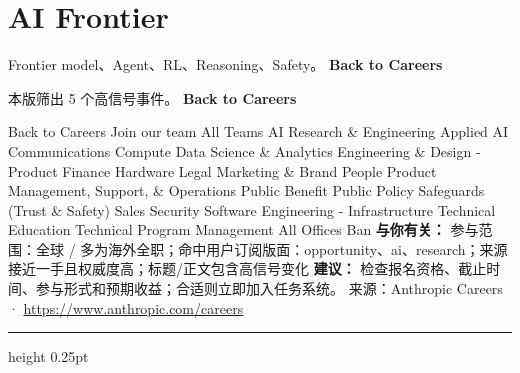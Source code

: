 \documentclass[10.5pt]{ctexart}
\begin{document}
\section*{AI Frontier}
{\color{ormuted} Frontier model、Agent、RL、Reasoning、Safety。}
\vspace{2mm}
{\LARGE\bfseries Back to Careers}\par
\vspace{1mm}
{\color{ormuted} 本版筛出 5 个高信号事件。}
\vspace{3mm}
{\Large\bfseries Back to Careers}\par
Back to Careers Join our team All Teams AI Research \& Engineering Applied AI Communications Compute Data Science \& Analytics Engineering \& Design - Product Finance Hardware Legal Marketing \& Brand People Product Management, Support, \& Operations Public Benefit Public Policy Safeguards (Trust \& Safety) Sales Security Software Engineering - Infrastructure Technical Education Technical Program Management All Offices Ban
\textbf{与你有关：} 参与范围：全球 / 多为海外全职；命中用户订阅版面：opportunity、ai、research；来源接近一手且权威度高；标题/正文包含高信号变化
\textbf{建议：} 检查报名资格、截止时间、参与形式和预期收益；合适则立即加入任务系统。
{\footnotesize\color{ormuted} 来源：Anthropic Careers · \url{https://www.anthropic.com/careers}}
\vspace{4mm}
\hrule height 0.25pt
\vspace{3mm}
\end{document}
